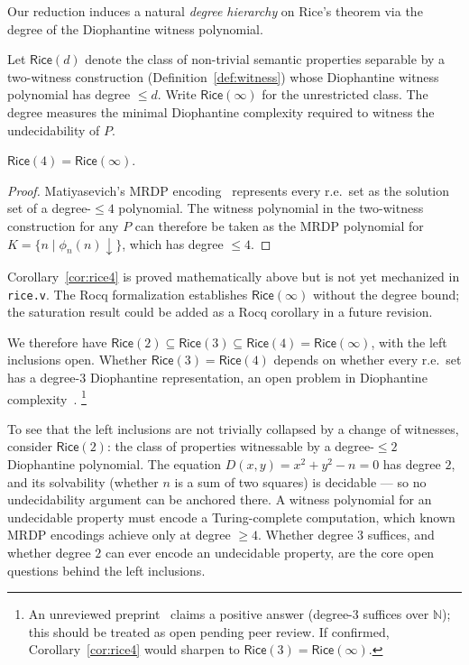 \documentclass{lmcs}
\begin{document}
Our reduction induces a natural \emph{degree hierarchy} on Rice's theorem
via the degree of the Diophantine witness polynomial.

\begin{defi}
\label{def:rice-degree}
Let $\mathsf{Rice}(d)$ denote the class of non-trivial semantic properties
separable by a two-witness construction (Definition~\ref{def:witness})
whose Diophantine witness polynomial has degree $\leq d$.
Write $\mathsf{Rice}(\infty)$ for the unrestricted class.
The degree measures the minimal Diophantine complexity required to
witness the undecidability of $P$.
\end{defi}

\begin{cor}
\label{cor:rice4}
$\mathsf{Rice}(4) = \mathsf{Rice}(\infty)$.
\end{cor}
\begin{proof}
Matiyasevich's MRDP encoding~\cite{matiyasevich1970} represents every r.e.\
set as the solution set of a degree-$\leq 4$ polynomial. The witness
polynomial in the two-witness construction for any $P$ can therefore be
taken as the MRDP polynomial for $K = \{n \mid \phi_n(n){\downarrow}\}$,
which has degree $\leq 4$.
\end{proof}

\begin{rem}
Corollary~\ref{cor:rice4} is proved mathematically above but is not yet
mechanized in \texttt{rice.v}. The Rocq formalization establishes
$\mathsf{Rice}(\infty)$ without the degree bound; the saturation result
could be added as a Rocq corollary in a future revision.
\end{rem}

We therefore have
$\mathsf{Rice}(2) \subseteq \mathsf{Rice}(3) \subseteq
\mathsf{Rice}(4) = \mathsf{Rice}(\infty)$,
with the left inclusions open.
Whether $\mathsf{Rice}(3) = \mathsf{Rice}(4)$ depends on whether
every r.e.\ set has a degree-$3$ Diophantine representation,
an open problem in Diophantine complexity~\cite{matiyasevich1993}.%
\footnote{An unreviewed preprint~\cite{rosko2025} claims a positive
answer (degree-$3$ suffices over $\mathbb{N}$); this should be treated
as open pending peer review. If confirmed, Corollary~\ref{cor:rice4}
would sharpen to $\mathsf{Rice}(3) = \mathsf{Rice}(\infty)$.}

To see that the left inclusions are not trivially collapsed by a change
of witnesses, consider $\mathsf{Rice}(2)$: the class of properties
witnessable by a degree-$\leq 2$ Diophantine polynomial. The equation
$D(x,y) = x^2 + y^2 - n = 0$ has degree $2$, and its solvability
(whether $n$ is a sum of two squares) is decidable --- so no
undecidability argument can be anchored there. A witness polynomial for
an undecidable property must encode a Turing-complete computation, which
known MRDP encodings achieve only at degree $\geq 4$. Whether degree $3$
suffices, and whether degree $2$ can ever encode an undecidable property,
are the core open questions behind the left inclusions.
\end{document}
